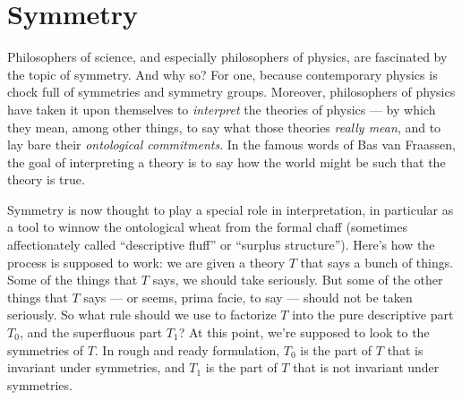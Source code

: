 


\section{Symmetry}


Philosophers of science, and especially philosophers of physics, are
fascinated by the topic of symmetry.  And why so?  For one, because
contemporary physics is chock full of symmetries and symmetry groups.
Moreover, philosophers of physics have taken it upon themselves to
{\it interpret} the theories of physics --- by which they mean, among
other things, to say what those theories {\it really mean}, and to lay
bare their {\it ontological commitments}.  In the famous words of Bas
van Fraassen, the goal of interpreting a theory is to say how the
world might be such that the theory is true.

Symmetry is now thought to play a special role in interpretation, in
particular as a tool to winnow the ontological wheat from the formal
chaff (sometimes affectionately called ``descriptive fluff'' or
``surplus structure'').  Here's how the process is supposed to work:
we are given a theory $T$ that says a bunch of things.  Some of the
things that $T$ says, we should take seriously.  But some of the other
things that $T$ says --- or seems, prima facie, to say --- should not
be taken seriously.  So what rule should we use to factorize $T$ into
the pure descriptive part $T_0$, and the superfluous part $T_1$?  At
this point, we're supposed to look to the symmetries of $T$.  In rough
and ready formulation, $T_0$ is the part of $T$ that is invariant
under symmetries, and $T_1$ is the part of $T$ that is not invariant
under symmetries.

